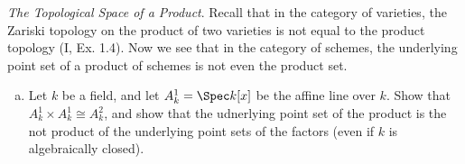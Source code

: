\begin{exercise}%
	\textit{The Topological Space of a Product}. Recall that in the category of varieties, the Zariski topology on the product of two varieties is not equal to the product topology (I, Ex. 1.4). Now we see that in the category of schemes, the underlying point set of a product of schemes is not even the product set.
	\begin{enumerate}[(a)]
		\item Let $k $ be a field, and let $A^1_k = \Spec k[x] $ be the affine line over $k $. Show that $A^1_k \times A_k^1 \cong A_k^2$, and show that the udnerlying point set of the product is the not product of the underlying point sets of the factors (even if $k$ is algebraically closed).
	\end{enumerate}
\end{exercise}

